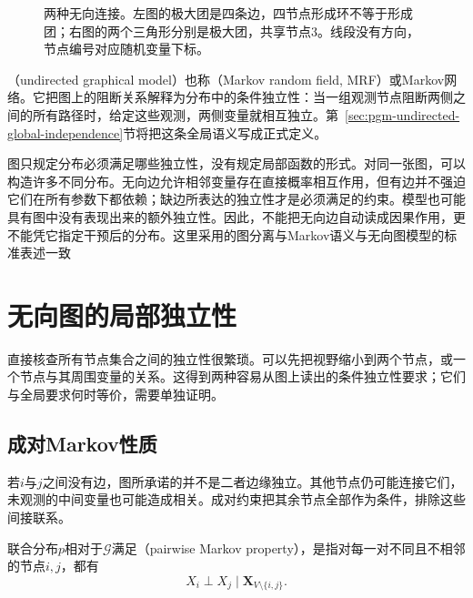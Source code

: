 \begin{figure}[htbp]
  \centering
  
  \caption{两种无向连接。左图的极大团是四条边，四节点形成环不等于形成团；右图的两个三角形分别是极大团，共享节点$3$。线段没有方向，节点编号对应随机变量下标。}
  \label{fig:pgm-undirected-cliques}
\end{figure}

（undirected graphical model）也称（Markov random field, MRF）或Markov网络。它把图上的阻断关系解释为分布中的条件独立性：当一组观测节点阻断两侧之间的所有路径时，给定这些观测，两侧变量就相互独立。第~\ref{sec:pgm-undirected-global-independence}节将把这条全局语义写成正式定义。

图只规定分布必须满足哪些独立性，没有规定局部函数的形式。对同一张图，可以构造许多不同分布。无向边允许相邻变量存在直接概率相互作用，但有边并不强迫它们在所有参数下都依赖；缺边所表达的独立性才是必须满足的约束。模型也可能具有图中没有表现出来的额外独立性。因此，不能把无向边自动读成因果作用，更不能凭它指定干预后的分布。这里采用的图分离与Markov语义与无向图模型的标准表述一致

\section{无向图的局部独立性}
\label{sec:pgm-undirected-local-independence}

直接核查所有节点集合之间的独立性很繁琐。可以先把视野缩小到两个节点，或一个节点与其周围变量的关系。这得到两种容易从图上读出的条件独立性要求；它们与全局要求何时等价，需要单独证明。

\subsection{成对Markov性质}
\label{sec:pgm-undirected-pairwise}

若$i$与$j$之间没有边，图所承诺的并不是二者边缘独立。其他节点仍可能连接它们，未观测的中间变量也可能造成相关。成对约束把其余节点全部作为条件，排除这些间接联系。

\begin{definition}[成对Markov性质]
  \label{def:pgm-undirected-pairwise}
  联合分布$p$相对于$\mathcal{G}$满足（pairwise Markov property），是指对每一对不同且不相邻的节点$i,j$，都有
  \begin{equation}
    X_i\perp X_j\mid\bm{X}_{V\setminus\{i,j\}}.
    \label{eq:pgm-undirected-pairwise}
  \end{equation}
\end{definition}

